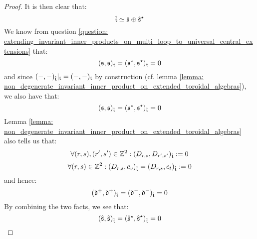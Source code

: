            \begin{proof}
                 It is then clear that:
                    $$\hat{\mathfrak{t}} \simeq \hat{\mathfrak{s}} \oplus \hat{\mathfrak{s}}^{\star}$$
                We know from question \ref{question: extending_invariant_inner_products_on_multi_loop_to_universal_central_extensions} that:
                    $$(\mathfrak{s}, \mathfrak{s})_{\mathfrak{t}} = (\mathfrak{s}^{\star}, \mathfrak{s}^{\star})_{\mathfrak{t}} = 0$$
                and since $(-, -)_{\hat{\mathfrak{t}}}|_{\mathfrak{t}} = (-, -)_{\mathfrak{t}}$ by construction (cf. lemma \ref{lemma: non_degenerate_invariant_inner_product_on_extended_toroidal_algebras}), we also have that:
                    $$(\mathfrak{s}, \mathfrak{s})_{\hat{\mathfrak{t}}} = (\mathfrak{s}^{\star}, \mathfrak{s}^{\star})_{\hat{\mathfrak{t}}} = 0$$
                Lemma \ref{lemma: non_degenerate_invariant_inner_product_on_extended_toroidal_algebras} also tells us that:
                    $$\forall (r, s), (r', s') \in \mathbb{Z}^2: (D_{r, s}, D_{r', s'})_{\hat{\mathfrak{t}}} := 0$$
                    $$\forall (r, s) \in \mathbb{Z}^2: (D_{r, s}, c_v)_{\hat{\mathfrak{t}}} = (D_{r, s}, c_t)_{\hat{\mathfrak{t}}} := 0$$ 
                and hence:
                    $$(\mathfrak{d}^+, \mathfrak{d}^+)_{\hat{\mathfrak{t}}} = (\mathfrak{d}^-, \mathfrak{d}^-)_{\hat{\mathfrak{t}}} = 0$$
                By combining the two facts, we see that:
                    $$(\hat{\mathfrak{s}}, \hat{\mathfrak{s}})_{\hat{\mathfrak{t}}} = (\hat{\mathfrak{s}}^{\star}, \hat{\mathfrak{s}}^{\star})_{\hat{\mathfrak{t}}} = 0$$
            \end{proof}
    
    \printbibliography

